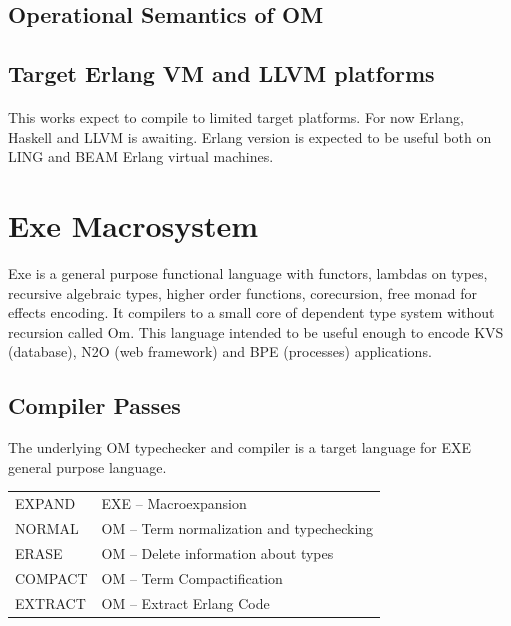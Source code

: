 \documentclass[11pt,oneside]{article}
\begin{document}
\subsection{Operational Semantics of OM}



\subsection{Target Erlang VM and LLVM platforms}

   \paragraph{}
   This works expect to compile to limited target platforms. For now Erlang, Haskell and LLVM is awaiting.
   Erlang version is expected to be useful both on LING and BEAM Erlang virtual machines.

\newpage
   \section{Exe Macrosystem}

   Exe is a general purpose functional language with functors, lambdas on types, recursive algebraic types,
   higher order functions, corecursion, free monad for effects encoding. It compilers
   to a small core of dependent type system without recursion called Om.
   This language intended to be useful enough to encode KVS (database), N2O (web framework) and
   BPE (processes) applications.

   \subsection{Compiler Passes}

   The underlying OM typechecker and compiler is a target language for EXE general purpose language.
   \begin{center}
   \begin{tabular}{ll}
   EXPAND  & EXE -- Macroexpansion\\
   NORMAL  & OM -- Term normalization and typechecking\\
   ERASE   & OM -- Delete information about types\\
   COMPACT & OM -- Term Compactification\\
   EXTRACT & OM -- Extract Erlang Code\\
   \end{tabular}
   \end{center}
\end{document}
